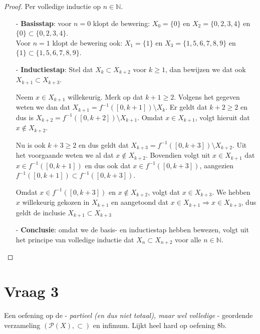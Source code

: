 \documentclass[kulak]{kulakarticle} %
\begin{document}
	\begin{proof}
		Per volledige inductie op \(n\in \mathbb{N}\).

		\begin{itemize}

			\item[-] \textbf{Basisstap}: voor \(n=0\) klopt de bewering: \( X_0 = \{ 0 \} \) en \( X_2 = \{ 0,2,3,4 \} \) en \( \{ 0 \} \subset \{ 0,2,3,4 \} \). \\Voor \(n=1\) klopt de bewering ook: \( X_1 = \{ 1 \} \) en \( X_3 = \{ 1,5,6,7,8,9 \} \) en \( \{ 1 \} \subset \{ 1,5,6,7,8,9 \} \).

			\item[-] \textbf{Inductiestap}: Stel dat \(X_k \subset X_{k+2}\) voor \(k \geq 1\), dan bewijzen we dat ook \(X_{k+1} \subset X_{k+3}\).

			Neem \(x\in X_{k+1}\) willekeurig. Merk op dat \(k+1\geq2\). Volgens het gegeven weten we dan dat \(X_{k+1}=f^{-1}([0,k+1])\setminus X_{k}\). Er geldt dat \(k+2\geq2\) en dus is \(X_{k+2}=f^{-1}([0,k+2])\setminus X_{k+1}\). Omdat \(x\in X_{k+1}\), volgt hieruit dat \(x\notin X_{k+2}\).

			Nu is ook \(k+3\geq2\) en dus geldt dat \(X_{k+3}=f^{-1}([0,k+3])\setminus X_{k+2}\). Uit het voorgaande weten we al dat \(x\notin X_{k+2}\). Bovendien volgt uit \(x\in X_{k+1}\) dat \(x\in f^{-1}([0,k+1])\) en dus ook dat \(x\in f^{-1}([0,k+3])\), aangezien \( f^{-1}([0,k+1]) \subset  f^{-1}([0,k+3])\).

			Omdat \(x\in f^{-1}([0,k+3])\) en \(x\notin X_{k+2}\), volgt dat \(x\in X_{k+3}\). We hebben \(x\) willekeurig gekozen in \(X_{k+1}\) en aangetoond dat \(x \in X_{k+1} \Rightarrow x \in X_{k+3}\), dus geldt de inclusie \(X_{k+1} \subset X_{k+3}\)

			\item[-] \textbf{Conclusie}: omdat we de basis- en inductiestap hebben bewezen, volgt uit het principe van volledige inductie dat \(X_n \subset X_{n+2}\) voor alle \(n \in \mathbb{N}\).
		\end{itemize}
	\end{proof}

	\section*{Vraag 3}

	Een oefening op de - \textit{partieel (en dus niet totaal), maar wel volledige} - geordende verzameling \((\mathcal{P}(X),\subset)\) en infimum. Lijkt heel hard op oefening 8b.
\end{document}
